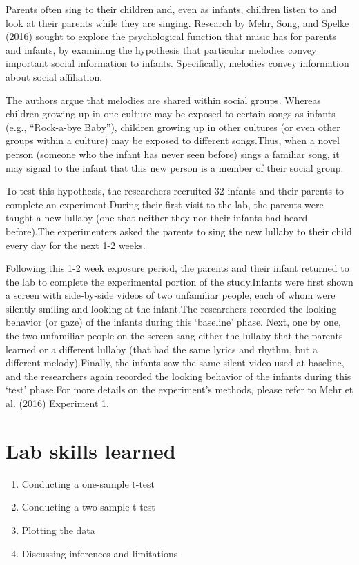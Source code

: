 \documentclass[]{book}
\providecommand{\tightlist}{%
  \setlength{\itemsep}{0pt}\setlength{\parskip}{0pt}}
\begin{document}
Parents often sing to their children and, even as infants, children
listen to and look at their parents while they are singing. Research by
Mehr, Song, and Spelke (2016) sought to explore the psychological
function that music has for parents and infants, by examining the
hypothesis that particular melodies convey important social information
to infants. Specifically, melodies convey information about social
affiliation.

The authors argue that melodies are shared within social groups. Whereas
children growing up in one culture may be exposed to certain songs as
infants (e.g., ``Rock-a-bye Baby''), children growing up in other
cultures (or even other groups within a culture) may be exposed to
different songs.Thus, when a novel person (someone who the infant has
never seen before) sings a familiar song, it may signal to the infant
that this new person is a member of their social group.

To test this hypothesis, the researchers recruited 32 infants and their
parents to complete an experiment.During their first visit to the lab,
the parents were taught a new lullaby (one that neither they nor their
infants had heard before).The experimenters asked the parents to sing
the new lullaby to their child every day for the next 1-2 weeks.

Following this 1-2 week exposure period, the parents and their infant
returned to the lab to complete the experimental portion of the
study.Infants were first shown a screen with side-by-side videos of two
unfamiliar people, each of whom were silently smiling and looking at the
infant.The researchers recorded the looking behavior (or gaze) of the
infants during this `baseline' phase. Next, one by one, the two
unfamiliar people on the screen sang either the lullaby that the parents
learned or a different lullaby (that had the same lyrics and rhythm, but
a different melody).Finally, the infants saw the same silent video used
at baseline, and the researchers again recorded the looking behavior of
the infants during this `test' phase.For more details on the
experiment's methods, please refer to Mehr et al. (2016) Experiment 1.

\section{Lab skills learned}\label{lab-skills-learned}

\begin{enumerate}
\def\labelenumi{\arabic{enumi}.}
\tightlist
\item
  Conducting a one-sample t-test
\item
  Conducting a two-sample t-test
\item
  Plotting the data
\item
  Discussing inferences and limitations
\end{enumerate}
\end{document}
